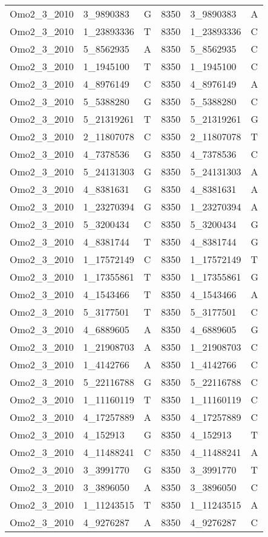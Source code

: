 \begin{center}
\begin{longtable}{|l|l|l|l|l|l|}
Omo2\_3\_2010&3\_9890383&G&8350&3\_9890383&A\\
Omo2\_3\_2010&1\_23893336&T&8350&1\_23893336&C\\
Omo2\_3\_2010&5\_8562935&A&8350&5\_8562935&C\\
Omo2\_3\_2010&1\_1945100&T&8350&1\_1945100&C\\
Omo2\_3\_2010&4\_8976149&C&8350&4\_8976149&A\\
Omo2\_3\_2010&5\_5388280&G&8350&5\_5388280&C\\
Omo2\_3\_2010&5\_21319261&T&8350&5\_21319261&G\\
Omo2\_3\_2010&2\_11807078&C&8350&2\_11807078&T\\
Omo2\_3\_2010&4\_7378536&G&8350&4\_7378536&C\\
Omo2\_3\_2010&5\_24131303&G&8350&5\_24131303&A\\
Omo2\_3\_2010&4\_8381631&G&8350&4\_8381631&A\\
Omo2\_3\_2010&1\_23270394&G&8350&1\_23270394&A\\
Omo2\_3\_2010&5\_3200434&C&8350&5\_3200434&G\\
Omo2\_3\_2010&4\_8381744&T&8350&4\_8381744&G\\
Omo2\_3\_2010&1\_17572149&C&8350&1\_17572149&T\\
Omo2\_3\_2010&1\_17355861&T&8350&1\_17355861&G\\
Omo2\_3\_2010&4\_1543466&T&8350&4\_1543466&A\\
Omo2\_3\_2010&5\_3177501&T&8350&5\_3177501&C\\
Omo2\_3\_2010&4\_6889605&A&8350&4\_6889605&G\\
Omo2\_3\_2010&1\_21908703&A&8350&1\_21908703&C\\
Omo2\_3\_2010&1\_4142766&A&8350&1\_4142766&C\\
Omo2\_3\_2010&5\_22116788&G&8350&5\_22116788&C\\
Omo2\_3\_2010&1\_11160119&T&8350&1\_11160119&C\\
Omo2\_3\_2010&4\_17257889&A&8350&4\_17257889&C\\
Omo2\_3\_2010&4\_152913&G&8350&4\_152913&T\\
Omo2\_3\_2010&4\_11488241&C&8350&4\_11488241&A\\
Omo2\_3\_2010&3\_3991770&G&8350&3\_3991770&T\\
Omo2\_3\_2010&3\_3896050&A&8350&3\_3896050&C\\
Omo2\_3\_2010&1\_11243515&T&8350&1\_11243515&A\\
Omo2\_3\_2010&4\_9276287&A&8350&4\_9276287&C\\

\end{longtable}
\end{center}

